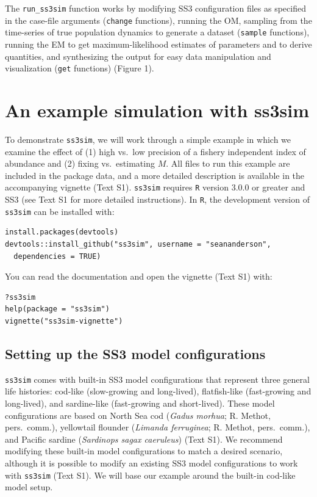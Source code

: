 \documentclass[11pt]{article}
\begin{document}
The \texttt{run\_ss3sim} function works by modifying SS3 configuration files as specified in the case-file arguments (\texttt{change} functions), running the OM, sampling from the time-series of true population dynamics to generate a dataset (\texttt{sample} functions), running the EM to get maximum-likelihood estimates of parameters and to derive quantities, and synthesizing the output for easy data manipulation and visualization (\texttt{get} functions) (Figure 1).

\section*{An example simulation with ss3sim}

To demonstrate \texttt{ss3sim}, we will work through a simple example in which we examine the effect of (1) high vs.~low precision of a fishery independent index of abundance and (2) fixing vs.~estimating $M$. All files to run this example are included in the package data, and a more detailed description is available in the accompanying vignette (Text S1). \texttt{ss3sim} requires \texttt{R} version 3.0.0 or greater and SS3 (see Text S1 for more detailed instructions). In \texttt{R}, the development version of \texttt{ss3sim} can be installed with:

\begin{verbatim}
install.packages(devtools)
devtools::install_github("ss3sim", username = "seananderson",
  dependencies = TRUE)
\end{verbatim}

\noindent
You can read the documentation and open the vignette (Text S1) with:

\begin{verbatim}
?ss3sim
help(package = "ss3sim")
vignette("ss3sim-vignette")
\end{verbatim}

\subsection*{Setting up the SS3 model configurations}

\texttt{ss3sim} comes with built-in SS3 model configurations that represent three general life histories: cod-like (slow-growing and long-lived), flatfish-like (fast-growing and long-lived), and sardine-like (fast-growing and short-lived). These model configurations are based on North Sea cod (\emph{Gadus morhua}; R. Methot, pers.~comm.), yellowtail flounder (\emph{Limanda ferruginea}; R. Methot, pers.~comm.), and Pacific sardine (\emph{Sardinops sagax caeruleus}) \cite{hill2012} (Text S1). We recommend modifying these built-in model configurations to match a desired scenario, although it is possible to modify an existing SS3 model configurations to work with \texttt{ss3sim} (Text S1). We will base our example around the built-in cod-like model setup.
\end{document}
